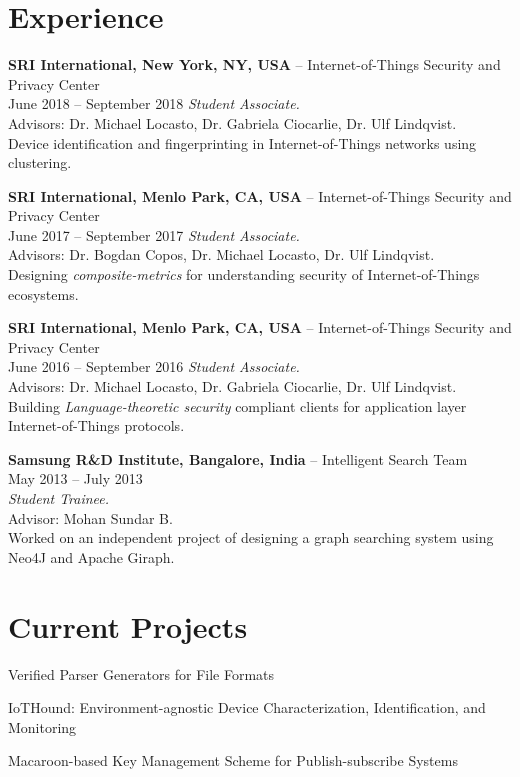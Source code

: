 \documentclass[letterpaper,10pt]{article}
\renewenvironment{itemize}{
	\begin{list}{}{
			\setlength{\leftmargin}{1.5em}
		}
	}{
	\end{list}
}
\begin{document}
\section*{Experience}
\begin{itemize}
	\setlength\itemsep{0ex}
	\item \textbf{SRI International, New York, NY, USA} -- Internet-of-Things Security and Privacy Center\\
		June 2018 -- September 2018
		\textit{Student Associate.} \\ Advisors: Dr. Michael Locasto, Dr. Gabriela Ciocarlie, Dr. Ulf Lindqvist.\\
		Device identification and fingerprinting in Internet-of-Things networks using clustering.
	\item \textbf{SRI International, Menlo Park, CA, USA} -- Internet-of-Things Security and Privacy Center\\
		June 2017 -- September 2017
		\textit{Student Associate.} \\ Advisors: Dr. Bogdan Copos, Dr. Michael Locasto, Dr. Ulf Lindqvist.\\
		Designing \textit{composite-metrics} for understanding security of Internet-of-Things ecosystems.
	\item \textbf{SRI International, Menlo Park, CA, USA} -- Internet-of-Things Security and Privacy Center\\
		June 2016 -- September 2016
		\textit{Student Associate.} \\ Advisors: Dr. Michael Locasto, Dr. Gabriela Ciocarlie, Dr. Ulf Lindqvist.\\
		Building \textit{Language-theoretic security} compliant clients for application layer Internet-of-Things protocols.
	\item \textbf{Samsung R\&D Institute, Bangalore, India} -- Intelligent Search Team\\
		May 2013 -- July 2013\\
		\textit{Student Trainee.} \\ Advisor: Mohan Sundar B.\\
		Worked on an independent project of designing a graph searching system using Neo4J and Apache Giraph.
\end{itemize}

\section*{Current Projects}
\begin{itemize}
	\setlength\itemsep{0ex}
	\item Verified Parser Generators for File Formats
	\item IoTHound: Environment-agnostic Device Characterization, Identification, and Monitoring
	\item Macaroon-based Key Management Scheme for Publish-subscribe Systems
\end{itemize}
\end{document}
